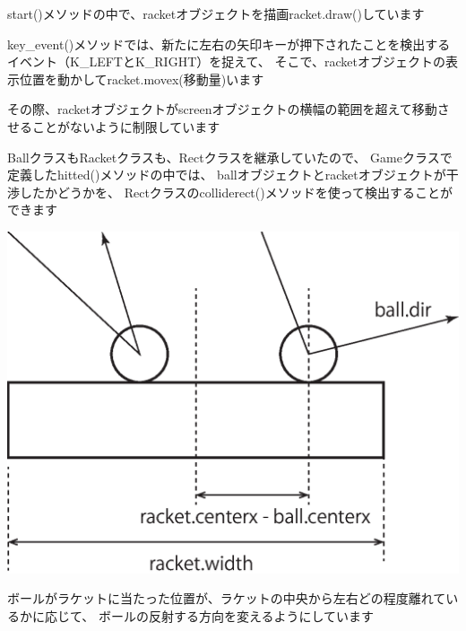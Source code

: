 \documentclass[uplatex,a4paper,11pt,oneside,openany]{jsbook}
\begin{document}
start()メソッドの中で、racketオブジェクトを描画racket.draw()しています

key\_event()メソッドでは、新たに左右の矢印キーが押下されたことを検出するイベント（K\_LEFTとK\_RIGHT）を捉えて、
そこで、racketオブジェクトの表示位置を動かしてracket.movex(移動量)います

その際、racketオブジェクトがscreenオブジェクトの横幅の範囲を超えて移動させることがないように制限しています

BallクラスもRacketクラスも、Rectクラスを継承していたので、
Gameクラスで定義したhitted()メソッドの中では、
ballオブジェクトとracketオブジェクトが干渉したかどうかを、
Rectクラスのcolliderect()メソッドを使って検出することができます

\begin{center}
  \includegraphics[width=0.4\hsize]{figures/eps/hitball.eps}
\end{center}

ボールがラケットに当たった位置が、ラケットの中央から左右どの程度離れているかに応じて、
ボールの反射する方向を変えるようにしています
\end{document}
